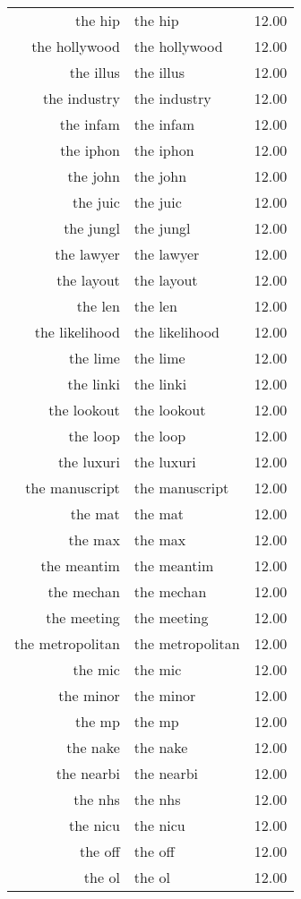 \begin{table}[ht]
\begin{tabular}{rlr}
  the hip & the hip & 12.00 \\ 
  the hollywood & the hollywood & 12.00 \\ 
  the illus & the illus & 12.00 \\ 
  the industry & the industry & 12.00 \\ 
  the infam & the infam & 12.00 \\ 
  the iphon & the iphon & 12.00 \\ 
  the john & the john & 12.00 \\ 
  the juic & the juic & 12.00 \\ 
  the jungl & the jungl & 12.00 \\ 
  the lawyer & the lawyer & 12.00 \\ 
  the layout & the layout & 12.00 \\ 
  the len & the len & 12.00 \\ 
  the likelihood & the likelihood & 12.00 \\ 
  the lime & the lime & 12.00 \\ 
  the linki & the linki & 12.00 \\ 
  the lookout & the lookout & 12.00 \\ 
  the loop & the loop & 12.00 \\ 
  the luxuri & the luxuri & 12.00 \\ 
  the manuscript & the manuscript & 12.00 \\ 
  the mat & the mat & 12.00 \\ 
  the max & the max & 12.00 \\ 
  the meantim & the meantim & 12.00 \\ 
  the mechan & the mechan & 12.00 \\ 
  the meeting & the meeting & 12.00 \\ 
  the metropolitan & the metropolitan & 12.00 \\ 
  the mic & the mic & 12.00 \\ 
  the minor & the minor & 12.00 \\ 
  the mp & the mp & 12.00 \\ 
  the nake & the nake & 12.00 \\ 
  the nearbi & the nearbi & 12.00 \\ 
  the nhs & the nhs & 12.00 \\ 
  the nicu & the nicu & 12.00 \\ 
  the off & the off & 12.00 \\ 
  the ol & the ol & 12.00 \\ 

\end{tabular}
\end{table}
